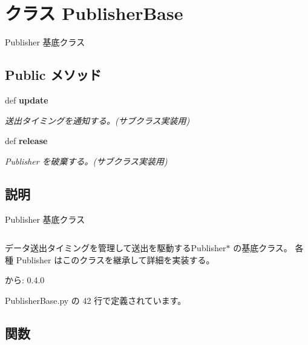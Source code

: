\section{クラス PublisherBase}
\label{classsource__py_1_1_publisher_base_1_1_publisher_base}
Publisher 基底クラス  


\subsection*{Public メソッド}
\begin{CompactItemize}
\item 
def {\bf update}
\begin{CompactList}\small\item\em 送出タイミングを通知する。(サブクラス実装用) \item\end{CompactList}\item 
def {\bf release}
\begin{CompactList}\small\item\em Publisher を破棄する。(サブクラス実装用) \item\end{CompactList}\end{CompactItemize}


\subsection{説明}
Publisher 基底クラス 



\footnotesize\begin{verbatim}
\end{verbatim}
\normalsize


データ送出タイミングを管理して送出を駆動するPublisher$\ast$ の基底クラス。 各種 Publisher はこのクラスを継承して詳細を実装する。

\begin{Desc}
\item[から:]0.4.0 \end{Desc}


 PublisherBase.py の 42 行で定義されています。

\subsection{関数}
